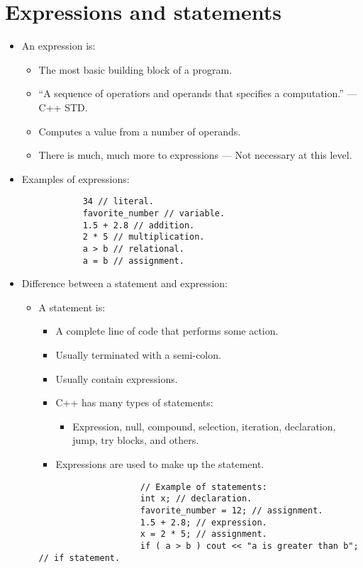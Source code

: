 \section{Expressions and statements}
\begin{itemize}
    \item An expression is: 
        \begin{itemize}
            \item The most basic building block of a program.
            \item ``A sequence of operatiors and operands that specifies a computation.'' — C++ STD.
            \item Computes a value from a number of operands.
            \item There is much, much more to expressions — Not necessary at this level.
        \end{itemize}
    
    \item Examples of expressions:
        \begin{verbatim}
            34 // literal.
            favorite_number // variable.
            1.5 + 2.8 // addition.
            2 * 5 // multiplication.
            a > b // relational.
            a = b // assignment.
        \end{verbatim}
    
    \item Difference between a statement and expression: 
        \begin{itemize}
            \item A statement is: 
                \begin{itemize}
                    \item A complete line of code that performs some action. 
                    \item Usually terminated with a semi-colon.
                    \item Usually contain expressions.
                    \item C++ has many types of statements:
                        \begin{itemize}
                            \item Expression, null, compound, selection, iteration, declaration, jump, try blocks, and others. 
                        \end{itemize}
                    \item Expressions are used to make up the statement.
                \end{itemize}
                \begin{verbatim}
                    // Example of statements:
                    int x; // declaration.
                    favorite_number = 12; // assignment.
                    1.5 + 2.8; // expression.
                    x = 2 * 5; // assignment.
                    if ( a > b ) cout << "a is greater than b"; // if statement.
                \end{verbatim}
            

\end{itemize}
\end{itemize}
